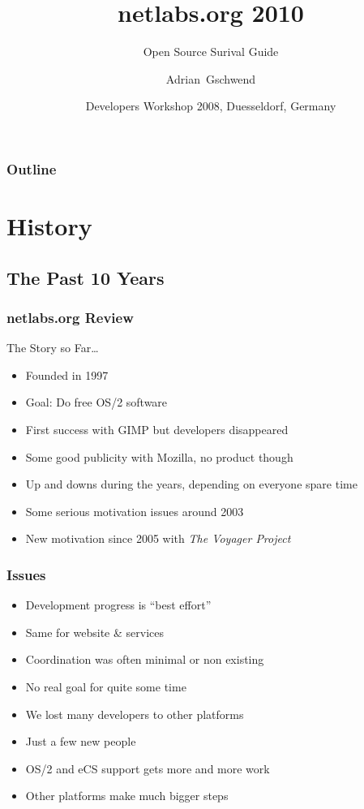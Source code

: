 \documentclass{beamer}
\title[netlabs.org - The Voyager Project]
{netlabs.org 2010}
\subtitle
{Open Source Surival Guide}
\author[Adrian Gschwend]
{Adrian~Gschwend}
\institute[netlabs.org]
{
netlabs.org - Open Source Software
}
\date[17.05.2008]
{Developers Workshop 2008, Duesseldorf, Germany}
\begin{document}
\begin{frame}
\titlepage
\end{frame}

\begin{frame}
\frametitle{Outline}
\tableofcontents[hideallsubsections]
\end{frame}

\section{History}

\subsection{The Past 10 Years}
\begin{frame}
\frametitle{netlabs.org Review}
The Story so Far\ldots
\begin{itemize}
  \item Founded in 1997
  \item Goal: Do free OS/2 software
  \item First success with GIMP but developers disappeared
  \item Some good publicity with Mozilla, no product though
  \item Up and downs during the years, depending on everyone spare time
  \item Some serious motivation issues around 2003
  \item New motivation since 2005 with \textit{The Voyager Project}
\end{itemize}
\end{frame}

\begin{frame}
\frametitle{Issues}
\begin{itemize}
  \item Development progress is ``best effort''
  \item Same for website \& services
  \item Coordination was often minimal or non existing
  \item No real goal for quite some time
  \item We lost many developers to other platforms
  \item Just a few new people
  \item OS/2 and eCS support gets more and more work
  \item Other platforms make much bigger steps
\end{itemize}
\end{frame}
\end{document}
